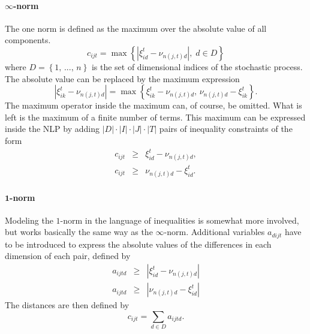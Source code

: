 \documentclass[a4paper, 12pt] {article}
\begin{document}
\paragraph{$\infty$-norm} The one norm is defined as the maximum over the absolute value of all components. 
\begin{equation}
  \label{eq:max-c-definition}
  c_{ijt} = \max\left\{\left|\xi_{id}^t-\nu_{n(j,t)d}\right|,\; d\in D\right\}
\end{equation}
where $D=\left\{1,\, ...,\,n\right\}$ is the set of dimensional indices of the stochastic process. The absolute value can be replaced by the maximum expression
\begin{equation}
  \label{eq:abs-is-a-max}
  \left|\xi_{ik}^t-\nu_{n(j,t)d}\right| = \max\left\{\xi_{ik}^t-\nu_{n(j,t)d},\, \nu_{n(j,t)d}-\xi_{ik}^t\right\}.
\end{equation}
The maximum operator inside the maximum can, of course, be omitted. What is left is the maximum of a finite number of terms. This maximum can be expressed inside the NLP by adding $ |D| \cdot |I|\cdot |J|\cdot |T|$ pairs of inequality constraints of the form
\begin{eqnarray}
  \label{eq:c-as-inftynorm}
  c_{ijt} &\geq& \xi_{id}^t - \nu_{n(j,t)d},\\
  c_{ijt} &\geq& \nu_{n(j,t)d} - \xi_{id}^t.  
\end{eqnarray}
\paragraph{$\mathbf{1}$-norm} Modeling the $1$-norm in the language of inequalities is somewhat more involved, but works basically the same way as the $\infty$-norm. Additional variables $a_{dijt}$ have to be introduced to express the absolute values of the differences in each dimension of each pair, defined by
\begin{eqnarray}
  \label{eq:c-as-1norm-def-a}
  a_{ijtd} &\geq& \left| \xi_{id}^t - \nu_{n(j,t)d}\right| \\
  a_{ijtd} &\geq& \left|  \nu_{n(j,t)d} - \xi_{id}^t\right|
\end{eqnarray}
The distances are then defined by
\begin{equation}
  \label{eq:c-as-1norm}
  c_{ijt} = \sum_{d \in D} a_{ijtd}.
\end{equation}
\end{document}
